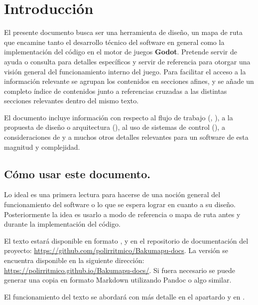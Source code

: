 \section{Introducción}\label{intro:introduccion}

El presente documento busca ser una herramienta de diseño, un mapa de ruta que encamine tanto el desarrollo técnico del software en general como la implementación del código en el motor de juegos \textbf{Godot}. Pretende servir de ayuda o consulta para detalles específicos y servir de referencia para otorgar una visión general del funcionamiento interno del juego. Para facilitar el acceso a la información relevante se agrupan los contenidos en secciones afines, y se añade un completo índice de contenidos junto a referencias cruzadas a las distintas secciones relevantes dentro del mismo texto.

El documento incluye información con respecto al flujo de trabajo (, ), a la propuesta de diseño o arquitectura (), al uso de sistemas de control  (), a consideraciones de  y a muchos otros detalles relevantes para un software de esta magnitud y complejidad.

\subsection{Cómo usar este documento.}\label{intro:como-usar-el-documento}
Lo ideal es una primera lectura para hacerse de una noción general del funcionamiento del software o lo que se espera lograr en cuanto a su diseño. Posteriormente la idea es usarlo a modo de referencia o mapa de ruta antes y durante la implementación del código.

El texto estará disponible en formato ,  y  en el repositorio de documentación del proyecto: \url{https://github.com/polirritmico/Bakumapu-docs}. La versión  se encuentra disponible en la siguiente dirección: \url{https://polirritmico.github.io/Bakumapu-docs/}. Si fuera necesario se puede generar una copia en formato Markdown utilizando Pandoc o algo similar.

El funcionamiento del texto se abordará con más detalle en el apartardo  y en .



